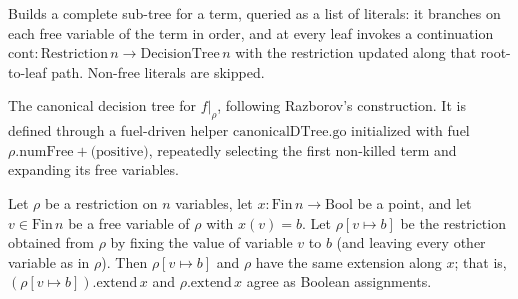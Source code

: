 \begin{definition}
\label{SwitchingLemma.termSubTree}
\leanok
{}
Builds a complete sub-tree for a term, queried as a list of literals: it branches on each
free variable of the term in order, and at every leaf invokes a continuation
$\mathrm{cont} : \mathrm{Restriction}\,n \to \mathrm{DecisionTree}\,n$ with the restriction updated
along that root-to-leaf path. Non-free literals are skipped.
\end{definition}

\begin{definition}
\label{SwitchingLemma.canonicalDTree}
\leanok
{}
The canonical decision tree for $f|_\rho$, following Razborov's construction. It is defined
through a fuel-driven helper $\mathrm{canonicalDTree.go}$ initialized with fuel
$\rho.\mathrm{numFree} + \text{(positive)}$, repeatedly selecting the first non-killed term and
expanding its free variables.
\end{definition}

\begin{lemma}
\label{SwitchingLemma.extend_update_self}
\leanok
{}
Let $\rho$ be a restriction on $n$ variables, let $x : \mathrm{Fin}\,n \to
\mathrm{Bool}$ be a point, and let $v \in \mathrm{Fin}\,n$ be a free variable of $\rho$
with $x(v) = b$. Let $\rho[v \mapsto b]$ be the restriction obtained from $\rho$ by
fixing the value of variable $v$ to $b$ (and leaving every other variable as in $\rho$).
Then $\rho[v \mapsto b]$ and $\rho$ have the same extension along $x$; that is, $(\rho[v
\mapsto b]).\mathrm{extend}\,x$ and $\rho.\mathrm{extend}\,x$ agree as Boolean
assignments.
\end{lemma}

